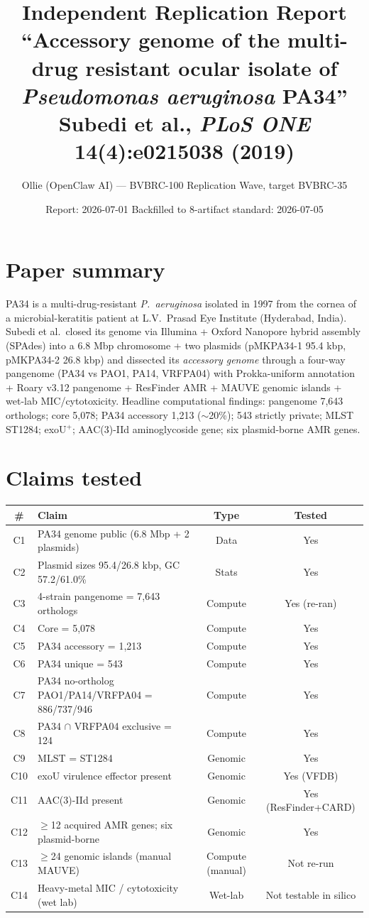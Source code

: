 \documentclass[11pt]{article}
\title{Independent Replication Report\\
\large ``Accessory genome of the multi-drug resistant ocular isolate of
\textit{Pseudomonas aeruginosa} PA34''\\
Subedi et al., \textit{PLoS ONE} \textbf{14}(4):e0215038 (2019)}
\author{Ollie (OpenClaw AI) --- BVBRC-100 Replication Wave, target BVBRC-35}
\date{Report: 2026-07-01 \quad Backfilled to 8-artifact standard: 2026-07-05}
\begin{document}
\maketitle

\section{Paper summary}
PA34 is a multi-drug-resistant \textit{P.\ aeruginosa} isolated in 1997 from the cornea of a
microbial-keratitis patient at L.V.\ Prasad Eye Institute (Hyderabad, India). Subedi et al.\
closed its genome via Illumina + Oxford Nanopore hybrid assembly (SPAdes) into a
6.8 Mbp chromosome + two plasmids (pMKPA34-1 95.4 kbp, pMKPA34-2 26.8 kbp) and dissected
its \emph{accessory genome} through a four-way pangenome (PA34 vs PAO1, PA14, VRFPA04)
with Prokka-uniform annotation + Roary v3.12 pangenome + ResFinder AMR + MAUVE genomic
islands + wet-lab MIC/cytotoxicity. Headline computational findings: pangenome 7{,}643
orthologs; core 5{,}078; PA34 accessory 1{,}213 ($\sim$20\%); 543 strictly private; MLST
ST1284; exoU$^+$; AAC(3)-IId aminoglycoside gene; six plasmid-borne AMR genes.

\section{Claims tested}
\begin{longtable}{clcc}
\toprule
\# & Claim & Type & Tested \\
\midrule
C1 & PA34 genome public (6.8 Mbp + 2 plasmids) & Data & Yes \\
C2 & Plasmid sizes 95.4/26.8 kbp, GC 57.2/61.0\% & Stats & Yes \\
C3 & 4-strain pangenome = 7{,}643 orthologs & Compute & Yes (re-ran) \\
C4 & Core = 5{,}078 & Compute & Yes \\
C5 & PA34 accessory = 1{,}213 & Compute & Yes \\
C6 & PA34 unique = 543 & Compute & Yes \\
C7 & PA34 no-ortholog PAO1/PA14/VRFPA04 = 886/737/946 & Compute & Yes \\
C8 & PA34 $\cap$ VRFPA04 exclusive = 124 & Compute & Yes \\
C9 & MLST = ST1284 & Genomic & Yes \\
C10 & exoU virulence effector present & Genomic & Yes (VFDB) \\
C11 & AAC(3)-IId present & Genomic & Yes (ResFinder+CARD) \\
C12 & $\geq$12 acquired AMR genes; six plasmid-borne & Genomic & Yes \\
C13 & $\geq$24 genomic islands (manual MAUVE) & Compute (manual) & Not re-run \\
C14 & Heavy-metal MIC / cytotoxicity (wet lab) & Wet-lab & Not testable in silico \\
\bottomrule
\end{longtable}
\end{document}
